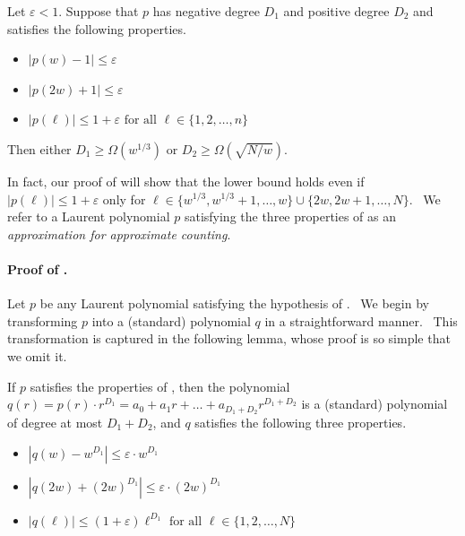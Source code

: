 \begin{theorem}
\label{mainthm} 
Let $\varepsilon < 1$. Suppose that $p$ has negative degree $D_1$ and positive
degree $D_2$ and satisfies the following properties.

\begin{itemize}
\item $\left\vert p(w)-1\right\vert \leq \varepsilon $

\item $\left\vert p(2w)+1\right\vert \leq \varepsilon $

\item $\left\vert p(\ell )\right\vert \leq 1+\varepsilon \text{ for all }
\ell \in \{1,2,\dots ,n\}$
\end{itemize}

Then either $D_1 \geq \Omega\left(w^{1/3}\right)$ or $D_2 \geq \Omega\left(\sqrt{N/w}
\right)$.
\end{theorem}

In fact, our proof of  will show that the lower bound holds
even if $\left\vert p(\ell )\right\vert \leq 1+\varepsilon $ only for $\ell
\in \{w^{1/3},w^{1/3}+1,\dots ,w\}\cup \{2w,2w+1,\dots ,N\}$. \ We refer to
a Laurent polynomial $p$ satisfying the three properties of 
as an \emph{approximation for approximate counting}.

\paragraph{Proof of .}

Let $p$ be any Laurent polynomial satisfying the hypothesis of 
. \ We begin by transforming $p$ into a (standard) polynomial $q$ in a
straightforward manner. \ This transformation is captured in the following
lemma, whose proof is so simple that we omit it.

\begin{lemma}
\label{mainlem} If $p$ satisfies the properties of , then the
polynomial $q(r) = p(r) \cdot r^{D_1}= a_0 + a_1 r + \dots + a_{D_1 + D_2}
r^{D_1 + D_2}$ is a (standard) polynomial of degree at most $D_1 + D_2$, and
$q$ satisfies the following three properties.

\begin{itemize}
\item $\left\vert q(w)-w^{D_{1}}\right\vert \leq \varepsilon \cdot w^{D_{1}}$

\item $\left\vert q(2w)+(2w)^{D_{1}}\right\vert \leq \varepsilon \cdot
(2w)^{D_{1}}$

\item $\left\vert q(\ell )\right\vert \leq \left( 1+\varepsilon \right) \ell
^{D_{1}}\text{ for all }\ell \in \{1,2,\dots ,N\}$
\end{itemize}
\end{lemma}

